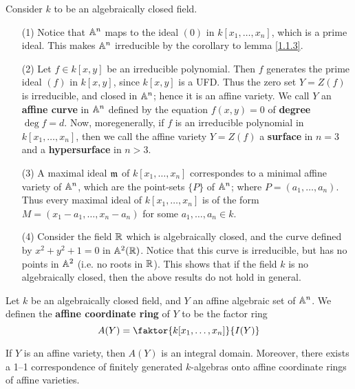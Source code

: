 \begin{example}\label{example_1.4}
    Consider $k$ to be an algebraically closed field.
    \begin{enumerate}
        \item[(1)] Notice that $\mathbb{A}^n$ maps to the ideal $(0)$ in $k[x_1, \dots,
            x_n]$, which is a prime ideal. This makes $\mathbb{A}^n$ irreducible by
            the corollary to lemma \ref{1.1.3}.

        \item[(2)] Let $f \in k[x,y]$ be an irreducible polynomial. Then $f$
            generates the prime ideal  $(f)$ in $k[x,y]$, since $k[x,y]$ is a
            UFD. Thus the zero set $Y=Z(f)$ is irreducible, and closed in
            $\mathbb{A}^n$; hence it is an affine variety. We call $Y$ an
            \textbf{affine curve} in $\mathbb{A}^n$ defined by the equation $f(x,y)=0$
            of \textbf{degree} $\deg{f}=d$. Now, moregenerally, if $f$ is an
            irreducible polynomial in $k[x_1, \dots, x_n]$, then we call the
            affine variety $Y=Z(f)$ a \textbf{surface} in $n=3$ and a
            \textbf{hypersurface} in $n>3$.

        \item[(3)] A maximal ideal $\mathfrak{m}$ of $k[x_1, \dots, x_n]$ correspondes to
            a minimal affine variety of $\mathbb{A}^n$, which are the point-sets $\{P\}$
            of $\mathbb{A}^n$; where  $P=(a_1, \dots, a_n)$. Thus every maximal ideal of
            $k[x_1, \dots, x_n]$ is of the form $M=(x_1-a_1, \dots,x_n-a_n)$ for
            some $a_1, \dots, a_n \in k$.

        \item[(4)] Consider the field $\mathbb{R}$ which is algebraically closed, and
            the curve defined by $x^2+y^2+1=0$ in $\mathbb{A}^2(\mathbb{R})$. Notice that this
            curve is irreducible, but has no points in $\mathbb{A}^2$  (i.e. no roots
            in $\mathbb{R}$). This shows that if the field $k$ is no algebraically
            closed, then the above results do not hold in general.
    \end{enumerate}
\end{example}

\begin{definition}
    Let $k$ be an algebraically closed field, and $Y$ an affine algebraic set of
     $\mathbb{A}^n$. We definen the \textbf{affine coordinate ring} of $Y$ to be the
     factor ring
     \begin{equation*}
         A(Y)=\faktor{k[x_1, \dots, x_n]}{I(Y)}
     \end{equation*}
\end{definition}

\begin{lemma}\label{1.1.4}
    If $Y$ is an affine variety, then  $A(Y)$ is an integral domain. Moreover,
    there exists a 1--1 correspondence of finitely generated $k$-algebras onto
    affine coordinate rings of affine varieties.
\end{lemma}
